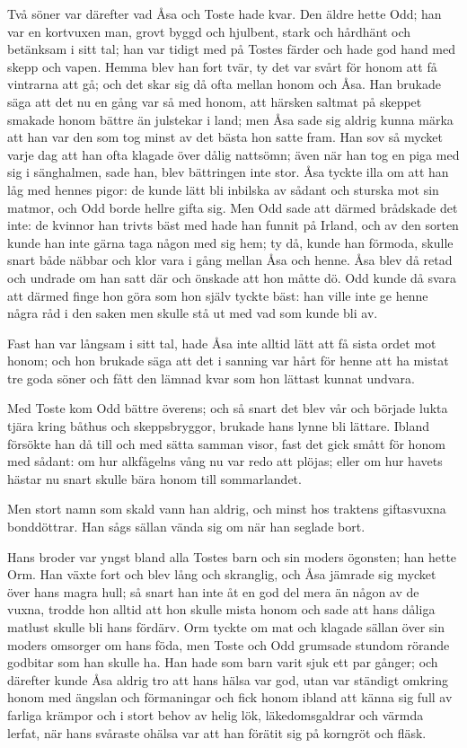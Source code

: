 \initial Två söner var därefter vad Åsa och Toste hade kvar. Den äldre hette Odd; han var en kortvuxen man, grovt byggd och hjulbent, stark och hårdhänt och betänksam i sitt tal; han var tidigt med på Tostes färder och hade god hand med skepp och vapen. Hemma blev han fort tvär, ty det var svårt för honom att få vintrarna att gå; och det skar sig då ofta mellan honom och Åsa. Han brukade säga att det nu en gång var så med honom, att härsken saltmat på skeppet smakade honom bättre än julstekar i land; men Åsa sade sig aldrig kunna märka att han var den som tog minst av det bästa hon satte fram. Han sov så mycket varje dag att han ofta klagade över dålig nattsömn; även när han tog en piga med sig i sänghalmen, sade han, blev bättringen inte stor. Åsa tyckte illa om att han låg med hennes pigor: de kunde lätt bli inbilska av sådant och sturska mot sin matmor, och Odd borde hellre gifta sig. Men Odd sade att därmed brådskade det inte: de kvinnor han trivts bäst med hade han funnit på Irland, och av den sorten kunde han inte gärna taga någon med sig hem; ty då, kunde han förmoda, skulle snart både näbbar och klor vara i gång mellan Åsa och henne. Åsa blev då retad och undrade om han satt där och önskade att hon måtte dö. Odd kunde då svara att därmed finge hon göra som hon själv tyckte bäst: han ville inte ge henne några råd i den saken men skulle stå ut med vad som kunde bli av.

\initial Fast han var långsam i sitt tal, hade Åsa inte alltid lätt att få sista ordet mot honom; och hon brukade säga att det i sanning var hårt för henne att ha mistat tre goda söner och fått den lämnad kvar som hon lättast kunnat undvara.

\initial Med Toste kom Odd bättre överens; och så snart det blev vår och började lukta tjära kring båthus och skeppsbryggor, brukade hans lynne bli lättare. Ibland försökte han då till och med sätta samman visor, fast det gick smått för honom med sådant: om hur alkfågelns vång nu var redo att plöjas; eller om hur havets hästar nu snart skulle bära honom till sommarlandet.

\initial Men stort namn som skald vann han aldrig, och minst hos traktens giftasvuxna bonddöttrar. Han sågs sällan vända sig om när han seglade bort.

\initial Hans broder var yngst bland alla Tostes barn och sin moders ögonsten; han hette Orm. Han växte fort och blev lång och skranglig, och Åsa jämrade sig mycket över hans magra hull; så snart han inte åt en god del mera än någon av de vuxna, trodde hon alltid att hon skulle mista honom och sade att hans dåliga matlust skulle bli hans fördärv. Orm tyckte om mat och klagade sällan över sin moders omsorger om hans föda, men Toste och Odd grumsade stundom rörande godbitar som han skulle ha. Han hade som barn varit sjuk ett par gånger; och därefter kunde Åsa aldrig tro att hans hälsa var god, utan var ständigt omkring honom med ängslan och förmaningar och fick honom ibland att känna sig full av farliga krämpor och i stort behov av helig lök, läkedomsgaldrar och värmda lerfat, när hans svåraste ohälsa var att han förätit sig på korngröt och fläsk.


